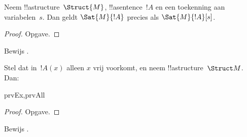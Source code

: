\documentclass[../../../include/open-logic-section]{subfiles}
\begin{document}
\begin{prop}
  Neem !!a{structure}~$\Struct{M}$, !!a{sentence}~$!A$ en een
  toekenning aan variabelen~$s$. Dan geldt $\Sat{M}{!A}$ precies als
  $\Sat{M}{!A}[s]$.
\end{prop}

\begin{proof}
Opgave.
\end{proof}

\begin{prob}
Bewijs .
\end{prob}

\begin{prop}
  Stel dat in~$!A(x)$ alleen $x$ vrij voorkomt, en neem
  !!a{structure}~$\Struct M$. Dan:
  \begin{tagenumerate}{prvEx,prvAll}
\end{tagenumerate}
\end{prop}

\begin{proof}
Opgave.
\end{proof}

\begin{prob}
Bewijs .
\end{prob}
\end{document}
